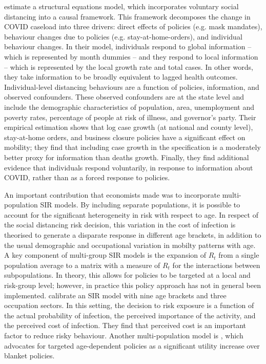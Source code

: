 \documentclass{article}
\begin{document}
\textcite{chernozhukovCausalImpactMasks2021} estimate a structural equations model, which incorporates voluntary social distancing into a causal framework. This framework decomposes the change in COVID caseload into three drivers: direct effects of policies (e.g. mask mandates), behaviour changes due to policies (e.g. stay-at-home-orders), and individual behaviour changes. In their model, individuals respond to global information -- which is represented by month dummies -- and they respond to local information -- which is represented by the local growth rate and total cases. In other words, they take information to be broadly equivalent to lagged health outcomes. Individual-level distancing behaviours are a function of policies, information, and observed confounders. These observed confounders are at the state level and include the demographic characteristics of population, area, unemployment and poverty rates, percentage of people at risk of illness, and governor's party. Their empirical estimation shows that log case growth (at national and county level), stay-at-home orders, and business closure policies have a significant effect on mobility; they find that including case growth in the specification is a moderately better proxy for information than deaths growth. Finally, they find additional evidence that individuals respond voluntarily, in response to information about COVID, rather than as a forced response to policies.

An important contribution that economists made was to incorporate multi-population SIR models. By including separate populations, it is possible to account for the significant heterogeneity in risk with respect to age. In respect of the social distancing risk decision, this variation in the cost of infection is theorised to generate a disparate response in different age brackets, in addition to the usual demographic and occupational variation in mobilty patterns with age. A key component of multi-group SIR models is the expansion of \(R_t\) from a single population average to a matrix with a measure of \(R_t\) for the interactions between subpopulations. In theory, this allows for policies to be targeted at a local and risk-group level; however, in practice this policy approach has not in general been implemented. \textcite{faveroRestartingEconomySaving2020} calibrate an SIR model with nine age brackets and three occupation sectors. In this setting, the decision to risk exposure is a function of the actual probability of infection, the perceived importance of the activity, and the perceived cost of infection. They find that perceived cost is an important factor to reduce risky behaviour. Another multi-population model is \textcite{acemogluOptimalTargetedLockdowns2020}, which advocates for targeted age-dependent policies as a significant utility increase over blanket policies. 
\end{document}
